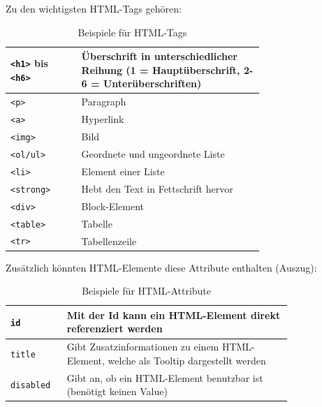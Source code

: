 Zu den wichtigsten HTML-Tags gehören: \cite{HTML-Tags}

\begin{table}[H]
    \centering
    \begin{tabular}{|l|p{0.72\linewidth}|}
        \hline
        \lstinline|<h1>| bis \lstinline|<h6>| & Überschrift in unterschiedlicher Reihung (1 = Hauptüberschrift, 2-6 = Unterüberschriften) \\ \hline
        \lstinline|<p>|                            & Paragraph                                                                                 \\ \hline
        \lstinline|<a>|                            & Hyperlink                                                                                 \\ \hline
        \lstinline|<img>|                            & Bild                                                                                      \\ \hline
        \lstinline|<ol/ul>|                            & Geordnete und ungeordnete Liste                                                           \\ \hline
        \lstinline|<li>|                            & Element einer Liste                                                                       \\ \hline
        \lstinline|<strong>|                            & Hebt den Text in Fettschrift hervor                                                       \\ \hline
        \lstinline|<div>|                            & Block-Element                                                                             \\ \hline
        \lstinline|<table>|                           & Tabelle                                                                                   \\ \hline
        \lstinline|<tr>|                           & Tabellenzeile                                                                             \\ \hline
    \end{tabular}
    \caption{Beispiele für HTML-Tags}
\end{table}

Zusätzlich könnten HTML-Elemente diese Attribute enthalten (Auszug):

\begin{table}[H]
    \centering
    \begin{tabular}{|l|p{0.8\linewidth}|}
        \hline
        \lstinline|id| & Mit der Id kann ein HTML-Element direkt referenziert werden                           \\ \hline
        \lstinline|title| & Gibt Zusatzinformationen zu einem HTML-Element, welche als Tooltip dargestellt werden \\ \hline
        \lstinline|disabled| & Gibt an, ob ein HTML-Element benutzbar ist (benötigt keinen Value)                    \\ \hline
    \end{tabular}
    \caption{Beispiele für HTML-Attribute}
\end{table}


